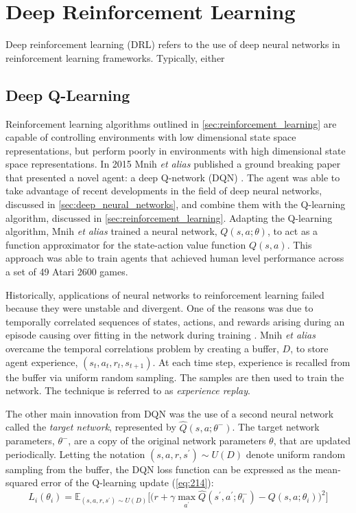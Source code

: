 \section{Deep Reinforcement Learning}\label{sec:deep_reinforcement_learning}
Deep reinforcement learning (DRL) refers to the use of deep neural networks in reinforcement learning frameworks. Typically, either 

\subsection{Deep Q-Learning}\label{ssec:deep_q_learning}
Reinforcement learning algorithms outlined in \textsection \ref{sec:reinforcement_learning} are capable of controlling environments with low dimensional state space representations, but perform poorly in environments with high dimensional state space representations. In 2015 Mnih \textit{et alias} published a ground breaking paper that presented a novel agent: a deep Q-network (DQN) \cite{Mnih2015}. The agent was able to take advantage of recent developments in the field of deep neural networks, discussed in \textsection \ref{sec:deep_neural_networks}, and combine them with the Q-learning algorithm, discussed in \textsection \ref{sec:reinforcement_learning}. Adapting the Q-learning algorithm, Mnih \textit{et alias} trained a neural network, $Q(s,a;\theta)$, to act as a function approximator for the state-action value function $Q(s,a)$. This approach was able to train agents that achieved human level performance across a set of 49 Atari 2600 games.

Historically, applications of neural networks to reinforcement learning failed because they were unstable and divergent. One of the reasons was due to temporally correlated sequences of states, actions, and rewards arising during an episode causing over fitting in the network during training \cite{Tsitsiklis1997}. Mnih \textit{et alias} overcame the temporal correlations problem by creating a buffer, $D$, to store agent experience, $(s_t, a_t, r_t, s_{t+1})$. At each time step, experience is recalled from the buffer via uniform random sampling. The samples are then used to train the network. The technique is referred to as \textit{experience replay}.

The other main innovation from DQN was the use of a second neural network called the \textit{target network}, represented by $\hat{Q}(s,a;\theta^-)$. The target network parameters, $\theta^-$, are a copy of the original network parameters $\theta$, that are updated periodically. Letting the notation $(s,a,r,s^\prime) \sim U(D)$ denote uniform random sampling from the buffer, the DQN loss function can be expressed as the mean-squared error of the Q-learning update (\ref{eq:214}):
\begin{equation}
	L_i(\theta_i) = \mathbb{E}_{(s,a,r,s^\prime) \sim U(D)} \bigg[ \bigg( r + \gamma \max_{a^\prime} \hat{Q}(s^\prime, a^\prime; \theta_i^-) - Q(s, a; \theta_i) \bigg)^2 \bigg] \label{eq:2401}
\end{equation}

